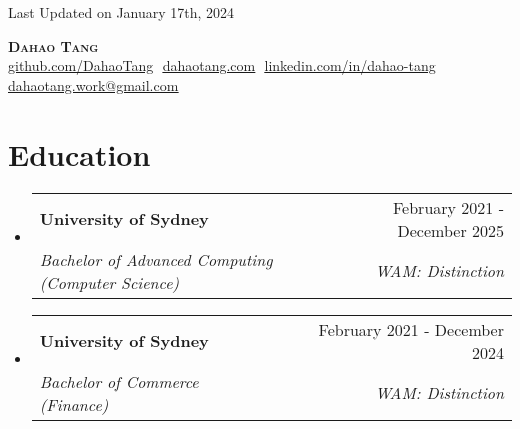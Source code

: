 \documentclass[letterpaper,11pt]{article}
\makeatletter
\newcommand{\resumeSubheading}[4]{
    \vspace{-2pt}\item
        \begin{tabular*}{0.97\textwidth}[t]{l@{\extracolsep{\fill}}r}
            \textbf{#1} & #2 \\
            \textit{\small#3} & \textit{\small #4} \\
    \end{tabular*}\vspace{-7pt}
}
\newcommand{\resumeSubHeadingListStart}{\begin{itemize}[leftmargin=0.15in, label={}]}
\newcommand{\resumeSubHeadingListEnd}{\end{itemize}}
\makeatother
\begin{document}
\begin{flushright}
    \color{gray}
    \item
    Last Updated on January 17th, 2024
\end{flushright}

\vspace{-5pt}

\begin{center}
    \textbf{\Huge \scshape Dahao Tang} \\ \vspace{8pt}
    \small 
    \href{https://github.com/DahaoTang}{\underline{github.com/DahaoTang}} $  $
    \href{https://www.dahaotang.com}
    {\underline{dahaotang.com}} $  $
    \href{https://linkedin.com/in/dahao-tang}{\underline{linkedin.com/in/dahao-tang}} $  $
    \href{mailto:dahaotang.work@gmail.com}
    {\underline{dahaotang.work@gmail.com}}
\end{center}

\section{Education}
    \resumeSubHeadingListStart
  
        \resumeSubheading
            {University of Sydney}{February 2021 - December 2025}
            {Bachelor of Advanced Computing (Computer Science)}{WAM: Distinction}
    
    
        \resumeSubheading
            {University of Sydney}{February 2021 - December 2024}
            {Bachelor of Commerce (Finance)}{WAM: Distinction}
    

    \resumeSubHeadingListEnd

\end{document}
